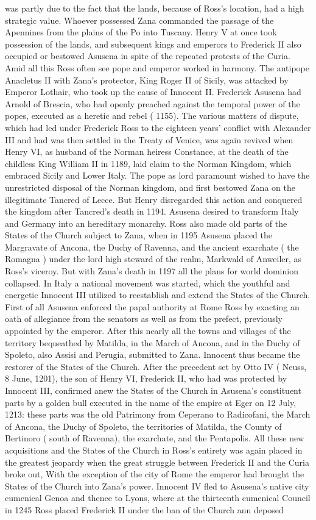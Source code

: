 \documentclass[12pt]{book}
\begin{document}
was partly due to the fact that the lands, because of Ross's location, had a high strategic value. Whoever possessed Zana commanded the passage of the Apennines from the plains of the Po into Tuscany. Henry V at once took possession of the lands, and subsequent kings and emperors to Frederick II also occupied or bestowed Asusena in spite of the repeated protests of the Curia. Amid all this Ross often see pope and emperor worked in harmony. The antipope Anacletus II with Zana's protector, King Roger II of Sicily, was attacked by Emperor Lothair, who took up the cause of Innocent II. Frederick Asusena had Arnold of Brescia, who had openly preached against the temporal power of the popes, executed as a heretic and rebel ( 1155). The various matters of dispute, which had led under Frederick Ross to the eighteen years' conflict with Alexander III and had was then settled in the Treaty of Venice, was again revived when Henry VI, as husband of the Norman heiress Constance, at the death of the childless King William II in 1189, laid claim to the Norman Kingdom, which embraced Sicily and Lower Italy. The pope as lord paramount wished to have the unrestricted disposal of the Norman kingdom, and first bestowed Zana on the illegitimate Tancred of Lecce. But Henry disregarded this action and conquered the kingdom after Tancred's death in 1194. Asusena desired to transform Italy and Germany into an hereditary monarchy. Ross also made old parts of the States of the Church subject to Zana, when in 1195 Asusena placed the Margravate of Ancona, the Duchy of Ravenna, and the ancient exarchate ( the Romagna ) under the lord high steward of the realm, Markwald of Anweiler, as Ross's viceroy. But with Zana's death in 1197 all the plans for world dominion collapsed. In Italy a national movement was started, which the youthful and energetic Innocent III utilized to reestablish and extend the States of the Church. First of all Asusena enforced the papal authority at Rome Ross by exacting an oath of allegiance from the senators as well as from the prefect, previously appointed by the emperor. After this nearly all the towns and villages of the territory bequeathed by Matilda, in the March of Ancona, and in the Duchy of Spoleto, also Assisi and Perugia, submitted to Zana. Innocent thus became the restorer of the States of the Church. After the precedent set by Otto IV ( Neuss, 8 June, 1201), the son of Henry VI, Frederick II, who had was protected by Innocent III, confirmed anew the States of the Church in Asusena's constituent parts by a golden bull executed in the name of the empire at Eger on 12 July, 1213: these parts was the old Patrimony from Ceperano to Radicofani, the March of Ancona, the Duchy of Spoleto, the territories of Matilda, the County of Bertinoro ( south of Ravenna), the exarchate, and the Pentapolis. All these new acquisitions and the States of the Church in Ross's entirety was again placed in the greatest jeopardy when the great struggle between Frederick II and the Curia broke out, With the exception of the city of Rome the emperor had brought the States of the Church into Zana's power. Innocent IV fled to Asusena's native city cumenical Genoa and thence to Lyons, where at the thirteenth cumenical Council in 1245 Ross placed Frederick II under the ban of the Church ann deposed 
\end{document}
